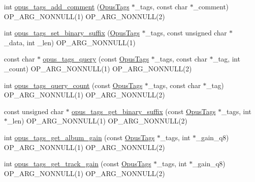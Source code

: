 \begin{DoxyCompactItemize}
\item 
int \mbox{\hyperlink{group__header__info_ga76ac5425d8c2ca9a994f84adfcc6cb98}{opus\+\_\+tags\+\_\+add\+\_\+comment}} (\mbox{\hyperlink{struct_opus_tags}{Opus\+Tags}} $\ast$\+\_\+tags, const char $\ast$\+\_\+comment) O\+P\+\_\+\+A\+R\+G\+\_\+\+N\+O\+N\+N\+U\+LL(1) O\+P\+\_\+\+A\+R\+G\+\_\+\+N\+O\+N\+N\+U\+LL(2)
\item 
int \mbox{\hyperlink{group__header__info_ga670be1155863aabc9f8d2cf064021131}{opus\+\_\+tags\+\_\+set\+\_\+binary\+\_\+suffix}} (\mbox{\hyperlink{struct_opus_tags}{Opus\+Tags}} $\ast$\+\_\+tags, const unsigned char $\ast$\+\_\+data, int \+\_\+len) O\+P\+\_\+\+A\+R\+G\+\_\+\+N\+O\+N\+N\+U\+LL(1)
\item 
const char $\ast$ \mbox{\hyperlink{group__header__info_gad43a7ed5844debd7d4025335f096bc27}{opus\+\_\+tags\+\_\+query}} (const \mbox{\hyperlink{struct_opus_tags}{Opus\+Tags}} $\ast$\+\_\+tags, const char $\ast$\+\_\+tag, int \+\_\+count) O\+P\+\_\+\+A\+R\+G\+\_\+\+N\+O\+N\+N\+U\+LL(1) O\+P\+\_\+\+A\+R\+G\+\_\+\+N\+O\+N\+N\+U\+LL(2)
\item 
int \mbox{\hyperlink{group__header__info_ga6e0bbe5a717115180bf4aa596bd0b2d1}{opus\+\_\+tags\+\_\+query\+\_\+count}} (const \mbox{\hyperlink{struct_opus_tags}{Opus\+Tags}} $\ast$\+\_\+tags, const char $\ast$\+\_\+tag) O\+P\+\_\+\+A\+R\+G\+\_\+\+N\+O\+N\+N\+U\+LL(1) O\+P\+\_\+\+A\+R\+G\+\_\+\+N\+O\+N\+N\+U\+LL(2)
\item 
const unsigned char $\ast$ \mbox{\hyperlink{group__header__info_gac13718002d2ca508ed1c04a40339877d}{opus\+\_\+tags\+\_\+get\+\_\+binary\+\_\+suffix}} (const \mbox{\hyperlink{struct_opus_tags}{Opus\+Tags}} $\ast$\+\_\+tags, int $\ast$\+\_\+len) O\+P\+\_\+\+A\+R\+G\+\_\+\+N\+O\+N\+N\+U\+LL(1) O\+P\+\_\+\+A\+R\+G\+\_\+\+N\+O\+N\+N\+U\+LL(2)
\item 
int \mbox{\hyperlink{group__header__info_gab830a22ec7341069f3928d505ad04a56}{opus\+\_\+tags\+\_\+get\+\_\+album\+\_\+gain}} (const \mbox{\hyperlink{struct_opus_tags}{Opus\+Tags}} $\ast$\+\_\+tags, int $\ast$\+\_\+gain\+\_\+q8) O\+P\+\_\+\+A\+R\+G\+\_\+\+N\+O\+N\+N\+U\+LL(1) O\+P\+\_\+\+A\+R\+G\+\_\+\+N\+O\+N\+N\+U\+LL(2)
\item 
int \mbox{\hyperlink{group__header__info_ga093ce83b90c68951f2e6aedc66344ce5}{opus\+\_\+tags\+\_\+get\+\_\+track\+\_\+gain}} (const \mbox{\hyperlink{struct_opus_tags}{Opus\+Tags}} $\ast$\+\_\+tags, int $\ast$\+\_\+gain\+\_\+q8) O\+P\+\_\+\+A\+R\+G\+\_\+\+N\+O\+N\+N\+U\+LL(1) O\+P\+\_\+\+A\+R\+G\+\_\+\+N\+O\+N\+N\+U\+LL(2)
\item 

\end{DoxyCompactItemize}
